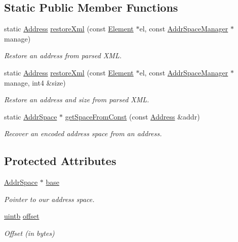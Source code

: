 \subsection*{Static Public Member Functions}
\begin{DoxyCompactItemize}
\item 
static \mbox{\hyperlink{class_address}{Address}} \mbox{\hyperlink{class_address_a31fdc8c33088abb3040027d35e7c4026}{restore\+Xml}} (const \mbox{\hyperlink{class_element}{Element}} $\ast$el, const \mbox{\hyperlink{class_addr_space_manager}{Addr\+Space\+Manager}} $\ast$manage)
\begin{DoxyCompactList}\small\item\em Restore an address from parsed X\+ML. \end{DoxyCompactList}\item 
static \mbox{\hyperlink{class_address}{Address}} \mbox{\hyperlink{class_address_a18a4b4f313eca927ac348a943c886365}{restore\+Xml}} (const \mbox{\hyperlink{class_element}{Element}} $\ast$el, const \mbox{\hyperlink{class_addr_space_manager}{Addr\+Space\+Manager}} $\ast$manage, int4 \&size)
\begin{DoxyCompactList}\small\item\em Restore an address and size from parsed X\+ML. \end{DoxyCompactList}\item 
static \mbox{\hyperlink{class_addr_space}{Addr\+Space}} $\ast$ \mbox{\hyperlink{class_address_acd17db20230415cb1fe1ad33c34c11ff}{get\+Space\+From\+Const}} (const \mbox{\hyperlink{class_address}{Address}} \&addr)
\begin{DoxyCompactList}\small\item\em Recover an encoded address space from an address. \end{DoxyCompactList}\end{DoxyCompactItemize}
\subsection*{Protected Attributes}
\begin{DoxyCompactItemize}
\item 
\mbox{\hyperlink{class_addr_space}{Addr\+Space}} $\ast$ \mbox{\hyperlink{class_address_ac08d67074731b83664127bb0cc190bfe}{base}}
\begin{DoxyCompactList}\small\item\em Pointer to our address space. \end{DoxyCompactList}\item 
\mbox{\hyperlink{types_8h_a2db313c5d32a12b01d26ac9b3bca178f}{uintb}} \mbox{\hyperlink{class_address_adbb9f0a40c81e28e83eca5a9de2959a8}{offset}}
\begin{DoxyCompactList}\small\item\em Offset (in bytes) \end{DoxyCompactList}\end{DoxyCompactItemize}
